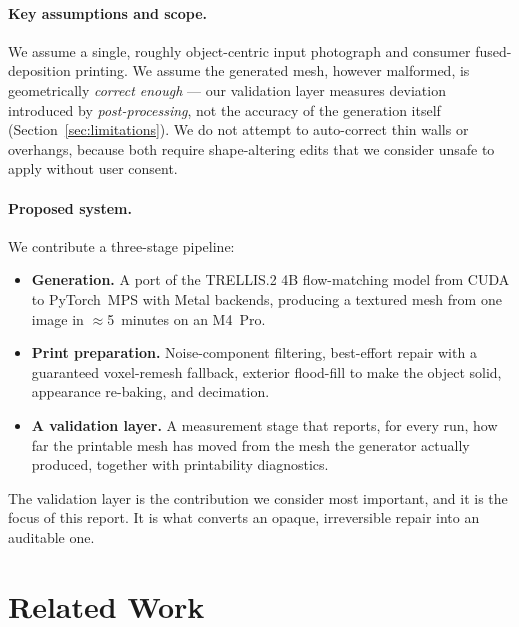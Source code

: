 \documentclass[11pt,a4paper]{article}
\begin{document}
\paragraph{Key assumptions and scope.}
We assume a single, roughly object-centric input photograph and consumer
fused-deposition printing. We assume the generated mesh, however malformed, is
geometrically \emph{correct enough} --- our validation layer measures deviation
introduced by \emph{post-processing}, not the accuracy of the generation itself
(Section~\ref{sec:limitations}). We do not attempt to auto-correct thin walls
or overhangs, because both require shape-altering edits that we consider unsafe
to apply without user consent.

\paragraph{Proposed system.}
We contribute a three-stage pipeline:

\begin{itemize}[leftmargin=*]
  \item \textbf{Generation.} A port of the TRELLIS.2 4B flow-matching model
        from CUDA to PyTorch~MPS with Metal backends, producing a textured mesh
        from one image in $\approx$5~minutes on an M4~Pro.
  \item \textbf{Print preparation.} Noise-component filtering, best-effort
        repair with a guaranteed voxel-remesh fallback, exterior flood-fill to
        make the object solid, appearance re-baking, and decimation.
  \item \textbf{A validation layer.} A measurement stage that reports, for
        every run, how far the printable mesh has moved from the mesh the
        generator actually produced, together with printability diagnostics.
\end{itemize}

The validation layer is the contribution we consider most important, and it is
the focus of this report. It is what converts an opaque, irreversible repair
into an auditable one.

\section{Related Work}
\end{document}
